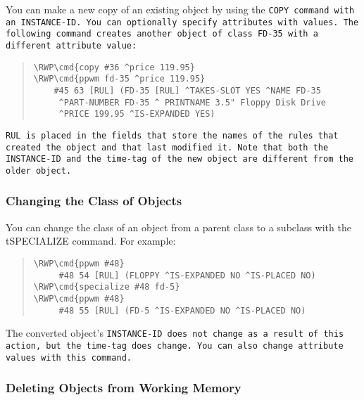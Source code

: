 You can make a new copy of an existing object by using the \tt{COPY}
command with an \tt{INSTANCE-ID}. You can optionally specify
attributes with values. The following command creates another object
of class FD-35 with a different attribute value:

\begin{quote}
\begin{Verbatim}[commandchars=\\\{\}]
\RWP\cmd{copy #36 ^price 119.95}
\RWP\cmd{ppwm fd-35 ^price 119.95}
    #45 63 [RUL] (FD-35 [RUL] ^TAKES-SLOT YES ^NAME FD-35
     ^PART-NUMBER FD-35 ^ PRINTNAME 3.5" Floppy Disk Drive
     ^PRICE 199.95 ^IS-EXPANDED YES)
\end{Verbatim}
\end{quote}

\tt{RUL} is placed in the fields that store the names of the rules
that created the object and that last modified it. Note that both the
\tt{INSTANCE-ID} and the time-tag of the new object are different from
the older object.

\subsubsection{Changing the Class of Objects}

You can change the class of an object from a parent class to a
subclass with the \\t{SPECIALIZE command}. For example:

\begin{quote}
\begin{Verbatim}[commandchars=\\\{\}]
\RWP\cmd{ppwm #48}
     #48 54 [RUL] (FLOPPY ^IS-EXPANDED NO ^IS-PLACED NO)
\RWP\cmd{specialize #48 fd-5}
\RWP\cmd{ppwm #48}
     #48 55 [RUL] (FD-5 ^IS-EXPANDED NO ^IS-PLACED NO)
\end{Verbatim}
\end{quote}

\begin{note}
  The converted object's \tt{INSTANCE-ID} does not change as a result
  of this action, but the time-tag does change. You can also change
  attribute values with this command.
\end{note}

\subsubsection{Deleting Objects from Working Memory}

